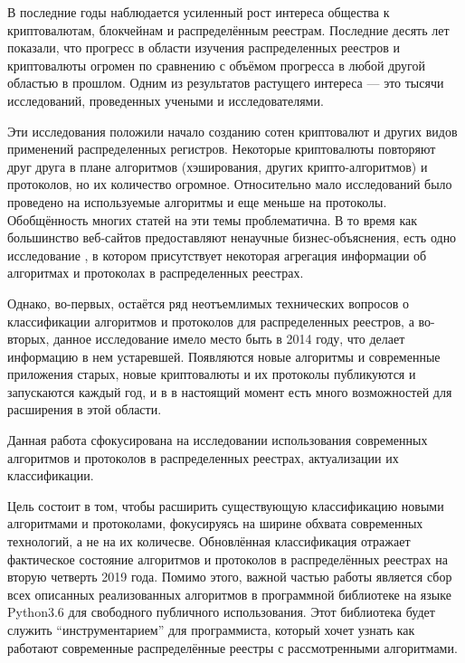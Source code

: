 \tab[0.88cm]В последние годы наблюдается усиленный рост интереса общества к криптовалютам,
блокчейнам и распределённым реестрам.
Последние десять лет показали, что прогресс в области изучения распределенных
реестров и криптовалюты огромен по сравнению с объёмом прогресса в любой
другой областью в прошлом.
Одним из результатов растущего интереса --- это тысячи исследований,
проведенных учеными и исследователями.

Эти исследования положили начало
созданию сотен криптовалют и других видов применений распределенных регистров.
Некоторые криптовалюты повторяют друг друга в плане алгоритмов (хэширования,
других крипто-алгоритмов) и протоколов, но их количество огромное. Относительно
мало исследований было проведено на используемые алгоритмы и еще меньше на
протоколы. Обобщённость многих статей на эти темы проблематична. В то время как
большинство веб-сайтов предоставляют ненаучные бизнес-объяснения, есть одно
исследование \cite{TimSwanson2014}, в котором присутствует некоторая
агрегация информации об алгоритмах и протоколах в распределенных реестрах.

Однако, во-первых, остаётся ряд неотъемлимых технических вопросов о
классификации алгоритмов и протоколов для распределенных реестров, а во-вторых,
данное исследование имело место быть в 2014 году, что делает информацию в нем
устаревшей.  Появляются новые алгоритмы и современные приложения старых, новые
криптовалюты и их протоколы публикуются и запускаются каждый год, и в в
настоящий момент есть много возможностей для расширения в этой области.

Данная работа сфокусирована на исследовании использования современных
алгоритмов и протоколов в распределенных реестрах, актуализации их
классификации.

Цель состоит в том, чтобы расширить существующую классификацию
новыми алгоритмами и протоколами, фокусируясь на ширине обхвата современных
технологий, а не на их количесве. Обновлённая классификация отражает
фактическое состояние алгоритмов и протоколов в распределённых реестрах на
вторую четверть 2019 года. Помимо этого, важной частью работы является сбор
всех описанных реализованных алгоритмов в программной библиотеке на языке
Python3.6 для свободного публичного использования. Этот библиотека будет
служить ``инструментарием'' для программиста, который хочет узнать как работают
современные распределённые реестры с рассмотренными алгоритмами.
